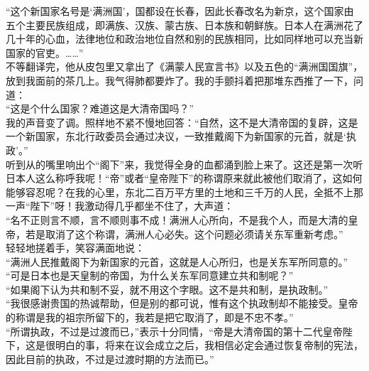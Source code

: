 “这个新国家名号是‘满洲国’，国都设在长春，因此长春改名为新京，这个国家由五个主要民族组成，即满族、汉族、蒙古族、日本族和朝鲜族。日本人在满洲花了几十年的心血，法律地位和政治地位自然和别的民族相同，比如同样地可以充当新国家的官吏。……”\\

不等翻译完，他从皮包里又拿出了《满蒙人民宣言书》以及五色的“满洲国国旗”，放到我面前的茶几上。我气得肺都要炸了。我的手颤抖着把那堆东西推了一下，问道：\\

“这是个什么国家？难道这是大清帝国吗？”\\

我的声音变了调。照样地不紧不慢地回答：“自然，这不是大清帝国的复辟，这是一个新国家，东北行政委员会通过决议，一致推戴阁下为新国家的元首，就是‘执政’。”\\

听到从的嘴里响出个“阁下”来，我觉得全身的血都涌到脸上来了。这还是第一次听日本人这么称呼我呢！“帝”或者“皇帝陛下”的称谓原来就此被他们取消了，这如何能够容忍呢？在我的心里，东北二百万平方里的土地和三千万的人民，全抵不上那一声“陛下”呀！我激动得几乎都坐不住了，大声道：\\

“名不正则言不顺，言不顺则事不成！满洲人心所向，不是我个人，而是大清的皇帝，若是取消了这个称谓，满洲人心必失。这个问题必须请关东军重新考虑。”\\

轻轻地搓着手，笑容满面地说：\\

“满洲人民推戴阁下为新国家的元首，这就是人心所归，也是关东军所同意的。”\\

“可是日本也是天皇制的帝国，为什么关东军同意建立共和制呢？”\\

“如果阁下认为共和制不妥，就不用这个字眼。这不是共和制，是执政制。”\\

“我很感谢贵国的热诚帮助，但是别的都可说，惟有这个执政制却不能接受。皇帝的称谓是我的祖宗所留下的，我若是把它取消了，即是不忠不孝。”\\

“所谓执政，不过是过渡而已，”表示十分同情，“帝是大清帝国的第十二代皇帝陛下，这是很明白的事，将来在议会成立之后，我相信必定会通过恢复帝制的宪法，因此目前的执政，不过是过渡时期的方法而已。”\\

